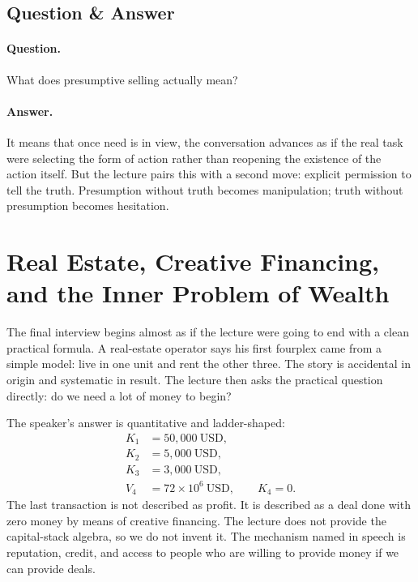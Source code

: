 \subsection{Question \& Answer}

\paragraph{Question.} What does presumptive selling actually mean?

\paragraph{Answer.} It means that once need is in view, the conversation advances as if the real task were selecting the form of action rather than reopening the existence of the action itself. But the lecture pairs this with a second move: explicit permission to tell the truth. Presumption without truth becomes manipulation; truth without presumption becomes hesitation.

\section{Real Estate, Creative Financing, and the Inner Problem of Wealth}

The final interview begins almost as if the lecture were going to end with a clean practical formula. A real-estate operator says his first fourplex came from a simple model: live in one unit and rent the other three. The story is accidental in origin and systematic in result. The lecture then asks the practical question directly: do we need a lot of money to begin?

The speaker's answer is quantitative and ladder-shaped:
\begin{align}
K_1 &= 50{,}000\ \mathrm{USD},\\
K_2 &= 5{,}000\ \mathrm{USD},\\
K_3 &= 3{,}000\ \mathrm{USD},\\
V_4 &= 72\times 10^{6}\ \mathrm{USD},\qquad K_4=0.
\end{align}
The last transaction is not described as profit. It is described as a deal done with zero money by means of creative financing. The lecture does not provide the capital-stack algebra, so we do not invent it. The mechanism named in speech is reputation, credit, and access to people who are willing to provide money if we can provide deals.

